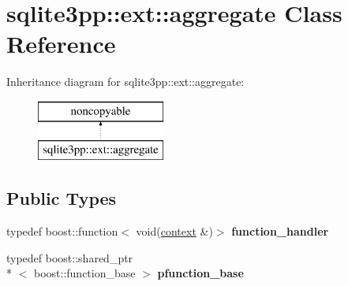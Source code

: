 \hypertarget{classsqlite3pp_1_1ext_1_1aggregate}{\section{sqlite3pp\-:\-:ext\-:\-:aggregate Class Reference}
\label{classsqlite3pp_1_1ext_1_1aggregate}
}
Inheritance diagram for sqlite3pp\-:\-:ext\-:\-:aggregate\-:\begin{figure}[H]
\begin{center}
\leavevmode
\includegraphics[height=2.000000cm]{classsqlite3pp_1_1ext_1_1aggregate}
\end{center}
\end{figure}
\subsection*{Public Types}
\begin{DoxyCompactItemize}
\item 
\hypertarget{classsqlite3pp_1_1ext_1_1aggregate_a42ce5bc3bb024595931764f2308f305e}{typedef boost\-::function$<$ void(\hyperlink{classsqlite3pp_1_1ext_1_1context}{context} \&)$>$ {\bfseries function\-\_\-handler}}\label{classsqlite3pp_1_1ext_1_1aggregate_a42ce5bc3bb024595931764f2308f305e}

\item 
\hypertarget{classsqlite3pp_1_1ext_1_1aggregate_a83211f4a5a9dfc213ff452245dde3d0d}{typedef boost\-::shared\-\_\-ptr\\*
$<$ boost\-::function\-\_\-base $>$ {\bfseries pfunction\-\_\-base}}\label{classsqlite3pp_1_1ext_1_1aggregate_a83211f4a5a9dfc213ff452245dde3d0d}

\end{DoxyCompactItemize}
